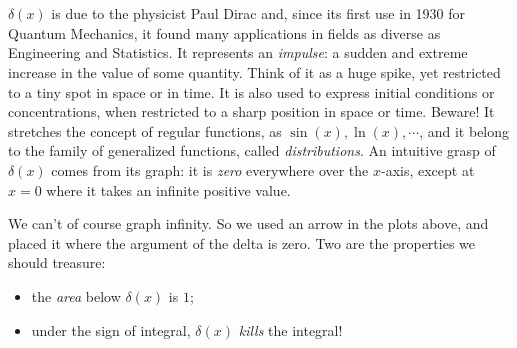 \begin{svgraybox}
	\\
	\\
	\(\delta(x)\) is due to the physicist Paul Dirac and, since its first use in 1930 for Quantum Mechanics, it found many applications in fields as diverse as Engineering and Statistics. It represents an \textit{impulse}: a sudden and extreme increase in the value of some quantity. Think of it as a huge spike, yet restricted to a tiny spot in space or in time. It is also used to express initial conditions or concentrations, when restricted to a sharp position in space or time. Beware! It stretches the concept of regular functions, as \(\sin(x), \ln(x), \cdots \), and it belong to the family of generalized  functions, called \textit{distributions}. An intuitive grasp of \(\delta(x)\) comes from its graph: it is \textit{zero} everywhere over the \(x\)-axis, except at \(x =0\) where it takes an infinite positive value.

  
	We can't of course graph infinity. So we used an arrow in the plots above, and placed it where the argument of the delta is zero. Two are the properties we should treasure: 
	\begin{itemize}
		\item the \textit{area} below \(\delta(x)\) is \(1\); 
		\item under the sign of integral, \(\delta(x)\) \textit{kills} the integral! 
	\end{itemize}	
	

\end{svgraybox}
